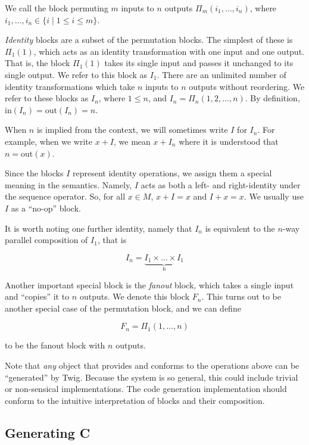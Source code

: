 We call the block permuting $m$ inputs to $n$ outputs
$\Pi_m(i_1,\ldots,i_n)$, where $i_1,\ldots,i_n \in \lbrace i \;|\;
1 \leq i \leq m \rbrace$.

\emph{Identity} blocks are a subset of the permutation blocks. The
simplest of these is $\Pi_1(1)$, which acts as an identity
transformation with one input and one output. That is, the block
$\Pi_1(1)$ takes its single input and passes it unchanged to its
single output. We refer to this block as $I_1$. There are an
unlimited number of identity transformations which take $n$ inputs
to $n$ outputs without reordering. We refer to these blocks as
$I_n$, where $1 \leq n$, and $I_n = \Pi_n(1,2,\ldots,n)$. By
definition, $\mbox{in}(I_n) = \mbox{out}(I_n) = n$.

When $n$ is implied from the context, we will sometimes write $I$
for $I_n$. For example, when we write $x+I$, we mean $x+I_n$ where
it is understood that $n = \mbox{out}(x)$.

Since the blocks $I$ represent identity operations, we assign them
a special meaning in the semantics. Namely, $I$ acts as both a
left- and right-identity under the sequence operator. So, for all
$x \in M$, $x + I = x$ and $I + x = x$. We usually use $I$ as a
``no-op'' block.

It is worth noting one further identity, namely that $I_n$ is
equivalent to the $n$-way parallel composition of $I_1$, that is

\[
I_n = \underbrace{I_1 \times \ldots \times I_1}_\text{n}
\]

Another important special block is the \emph{fanout} block, which
takes a single input and ``copies'' it to $n$ outputs. We denote
this block $F_n$. This turns out to be another special case of the
permutation block, and we can define

\[
F_n = \Pi_1(1,\ldots,n)
\]

to be the fanout block with $n$ outputs.

Note that \emph{any} object that provides and conforms to the
operations above can be ``generated'' by Twig. Because the system
is so general, this could include trivial or non-sensical
implementations. The code generation implementation should conform
to the intuitive interpretation of blocks and their composition.


\subsection{Generating C}
\label{sec:code-gen:c}

